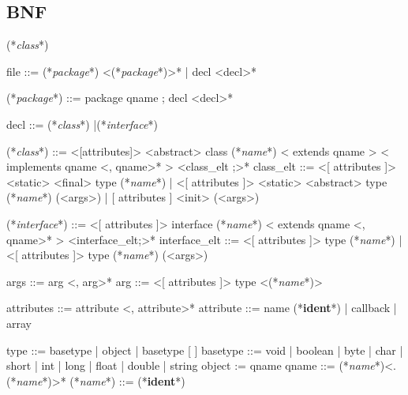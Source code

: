 \documentclass[a4paper, 11pt]{report}
\newcommand{\class}{\ttfamily\textit{class}}
\newcommand{\interface}{\ttfamily\textit{interface}}
\newcommand{\name}{\ttfamily\textit{name}}
\newcommand{\package}{\ttfamily\textit{package}}
\newcommand{\ident}{\footnotesize\textbf{ident}}
\begin{document}
\subsection*{BNF}
\begin{idl}
(*\class*)

file ::= (*\package*) <(*\package*)>*
  	| decl <decl>*
 
(*\package*) ::= package qname ; decl <decl>*

decl ::= (*\class*)
  	|(*\interface*)
 
(*\class*) ::= <[attributes]> <abstract> class (*\name*)
  	  < extends qname >
  	  < implements qname <, qname>* >
  	  { <class_elt ;>* }
class_elt ::= <[ attributes ]> <static> <final> type (*\name*)
            | <[ attributes ]> <static> <abstract> type (*\name*) (<args>)
            | [ attributes ] <init> (<args>)
 
(*\interface*) ::= <[ attributes ]> interface (*\name*)
  	       < extends qname <, qname>* >
  	      { <interface_elt;>* }
interface_elt ::= 
     <[ attributes ]> type (*\name*)
   | <[ attributes ]> type (*\name*) (<args>)
 
args ::= arg <, arg>*
arg ::= <[ attributes ]> type <(*\name*)>
 
attributes ::= 	attribute <, attribute>*
attribute ::= name (*\ident*)
  	    | callback
  	    | array
 
type ::= basetype
       | object
       | basetype [ ]
basetype ::= void
           | boolean
           | byte
           | char
           | short
           | int
           | long
           | float
           | double
           | string
object := qname
qname ::= (*\name*)<.(*\name*)>*
(*\name*) ::= (*\ident*)
\end{idl}
\newpage
\end{document}
